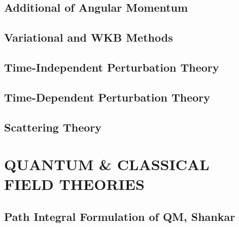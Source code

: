 \documentclass{book}
\theoremstyle{definition}
\begin{document}
\newpage



\section{Additional of Angular Momentum}


\newpage



\section{Variational and WKB Methods}



\newpage


\section{Time-Independent Perturbation Theory}


\newpage



\section{Time-Dependent Perturbation Theory}


\newpage


\section{Scattering Theory}


\newpage

























\chapter{QUANTUM \& CLASSICAL FIELD THEORIES}


\newpage



\section{Path Integral Formulation of QM, Shankar}
\end{document}
